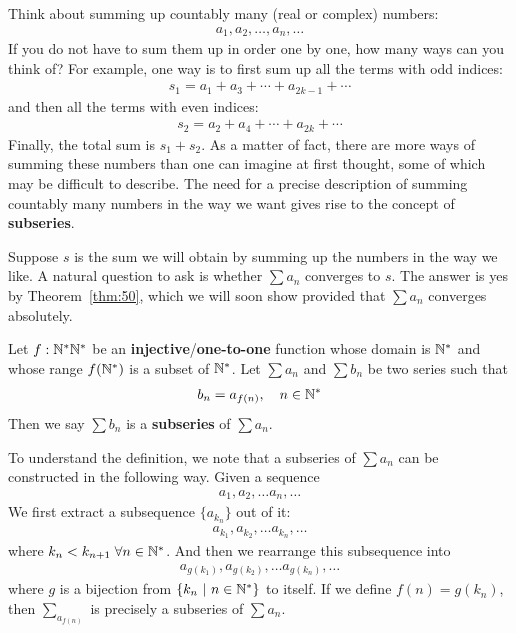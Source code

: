 \documentclass[thmcnt=section, 12pt]{my-elegantbook}
\begin{document}
Think about summing up countably many (real or complex) numbers:
\begin{align*}
    a_1, a_2, \ldots, a_n, \ldots
\end{align*}
If you do not have to sum them up in order one by one, how many ways can you think of? For example, one way is to first sum up all the terms with odd indices:
\begin{align*}
    s_1 = a_1 + a_3 + \cdots + a_{2k-1} + \cdots
\end{align*}
and then all the terms with even indices:
\begin{align*}
    s_2 = a_2 + a_4 + \cdots + a_{2k} + \cdots
\end{align*}
Finally, the total sum is $s_1 + s_2$. As a matter of fact, there are more ways of summing these numbers than one can imagine at first thought, some of which may be difficult to describe. The need for a precise description of summing countably many numbers in the way we want gives rise to the concept of \textbf{subseries}.

Suppose $s$ is the sum we will obtain by summing up the numbers in the way we like. A natural question to ask is whether $\sum a_n$ converges to $s$. The answer is yes by Theorem~\ref{thm:50}, which we will soon show provided that $\sum a_n$ converges absolutely.


\begin{definition}
    Let $f: \mathbb{N}^\ast \mathbb{N}^\ast$ be an \textbf{injective}/\textbf{one-to-one} function whose domain is $\mathbb{N}^\ast$ and whose range $f(\mathbb{N}^\ast)$ is a subset of $\mathbb{N}^\ast$. Let $\sum a_n$ and $\sum b_n$ be two series such that 
    \begin{align*}
        b_n = a_{f(n)}, 
        \quad n \in \mathbb{N}^\ast
    \end{align*}
    Then we say $\sum b_n$ is a \textbf{subseries} of $\sum a_n$.
\end{definition}

To understand the definition, we note that a subseries of $\sum a_n$ can be constructed in the following way. Given a sequence
\begin{align*}
    a_1, a_2, \ldots a_n, \ldots
\end{align*}
We first extract a subsequence $\{a_{k_n}\}$ out of it:
\begin{align*}
    a_{k_1}, a_{k_2}, \ldots a_{k_n}, \ldots
\end{align*}
where $k_{n} < k_{n+1} \; \forall n \in \mathbb{N}^\ast$. And then we rearrange this subsequence into 
\begin{align*}
    a_{g(k_1)}, a_{g(k_2)}, \ldots a_{g(k_n)}, \ldots
\end{align*}
where $g$ is a bijection from $\left\{ k_n \ \middle| \ n \in \mathbb{N}^\ast \right\}$ to itself. If we define $f(n) = g(k_n)$, then $\sum_{a_{f(n)}}$ is precisely a subseries of $\sum a_n$.
\end{document}
